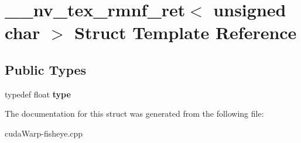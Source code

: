 \hypertarget{struct____nv__tex__rmnf__ret_3_01unsigned_01char_01_4}{}\section{\+\_\+\+\_\+nv\+\_\+tex\+\_\+rmnf\+\_\+ret$<$ unsigned char $>$ Struct Template Reference}
\label{struct____nv__tex__rmnf__ret_3_01unsigned_01char_01_4}
\subsection*{Public Types}
\begin{DoxyCompactItemize}
\item 
typedef float {\bfseries type}\hypertarget{struct____nv__tex__rmnf__ret_3_01unsigned_01char_01_4_a7e56638dd04b7d9dddce65b3f1091334}{}\label{struct____nv__tex__rmnf__ret_3_01unsigned_01char_01_4_a7e56638dd04b7d9dddce65b3f1091334}

\end{DoxyCompactItemize}


The documentation for this struct was generated from the following file\+:\begin{DoxyCompactItemize}
\item 
cuda\+Warp-\/fisheye.\+cpp\end{DoxyCompactItemize}
